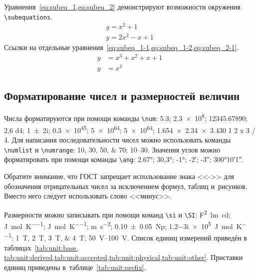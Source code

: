 Уравнения~\cref{eq:subeq_1,eq:subeq_2} демонстрируют возможности
окружения \verb|\subequations|.
\begin{subequations}
    \label{eq:subeq_1}
    \begin{gather}
        y = x^2 + 1 \label{eq:subeq_1-1} \\
        y = 2 x^2 - x + 1 \label{eq:subeq_1-2}
    \end{gather}
\end{subequations}
Ссылки на отдельные уравнения~\cref{eq:subeq_1-1,eq:subeq_1-2,eq:subeq_2-1}.
\begin{subequations}
    \label{eq:subeq_2}
    \begin{align}
        y &= x^3 + x^2 + x + 1 \label{eq:subeq_2-1} \\
        y &= x^2
    \end{align}
\end{subequations}

\subsection{Форматирование чисел и размерностей величин}\label{sec:units}

Числа форматируются при помощи команды \verb|\num|:
\num{5,3};
\num{2,3e8};
\num{12345,67890};
\num{2,6 d4};
\num{1+-2i};
\num{.3e45};
\num[exponent-base=2]{5 e64};
\num[exponent-base=2,exponent-to-prefix]{5 e64};
\num{1.654 x 2.34 x 3.430}
\num{1 2 x 3 / 4}.
Для написания последовательности чисел можно использовать команды \verb|\numlist| и \verb|\numrange|:
\numlist{10;30;50;70}; \numrange{10}{30}.
Значения углов можно форматировать при помощи команды \verb|\ang|:
\ang{2.67};
\ang{30,3};
\ang{-1;;};
\ang{;-2;};
\ang{;;-3};
\ang{300;10;1}.

Обратите внимание, что ГОСТ запрещает использование знака <<->> для обозначения отрицательных чисел
за исключением формул, таблиц и~рисунков.
Вместо него следует использовать слово <<минус>>.

Размерности можно записывать при помощи команд \verb|\si| и \verb|\SI|:
\si{\farad\squared\lumen\candela};
\si{\joule\per\mole\per\kelvin};
\si[per-mode = symbol-or-fraction]{\joule\per\mole\per\kelvin};
\si{\metre\per\second\squared};
\SI{0.10(5)}{\neper};
\SI{1.2-3i e5}{\joule\per\mole\per\kelvin};
\SIlist{1;2;3;4}{\tesla};
\SIrange{50}{100}{\volt}.
Список единиц измерений приведён в таблицах~\cref{tab:unit:base,
tab:unit:derived,tab:unit:accepted,tab:unit:physical,tab:unit:other}.
Приставки единиц приведены в~таблице~\cref{tab:unit:prefix}.

